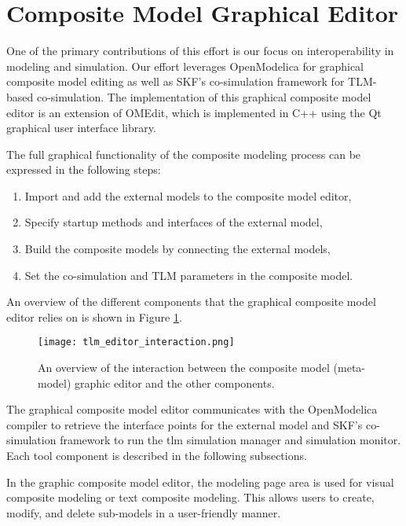 \section{Composite Model Graphical Editor}
\label{sec:tlmeditor}

One of the primary contributions of this effort is our focus on interoperability in modeling and simulation.
Our effort leverages OpenModelica for graphical composite model editing as well as SKF’s co-simulation framework for TLM-based co-simulation. The implementation of this graphical composite model editor is an extension of OMEdit, which is implemented in C++ using the Qt graphical user interface library.

The full graphical functionality of the composite modeling process can be expressed in the following steps:

\begin{enumerate}
	
\item Import and add the external models to the composite model editor,
\item Specify startup methods and interfaces of the external model,
\item Build the composite models by connecting the external models,
\item Set the co-simulation and TLM parameters in the composite model.

\end{enumerate}

An overview of the different components that the graphical composite model editor relies on is shown in Figure \ref{fig:tlmeditorinteraction}. 

\begin{figure}
	\texttt{[image: tlm\_editor\_interaction.png]}
	\caption{An overview of the interaction between the composite model (meta-model) graphic editor and the other components.}
	\label{fig:tlmeditorinteraction}
\end{figure}

The graphical composite model editor communicates with the OpenModelica compiler to
retrieve the interface points for the external model and SKF’s co-simulation framework to run the \acrshort{tlm} simulation manager and simulation monitor. Each tool component is described in the following subsections.

In the graphic composite model editor, the modeling page area is used for visual composite modeling or text
composite modeling. This allows users to create, modify, and delete sub-models in a user-friendly manner. 

